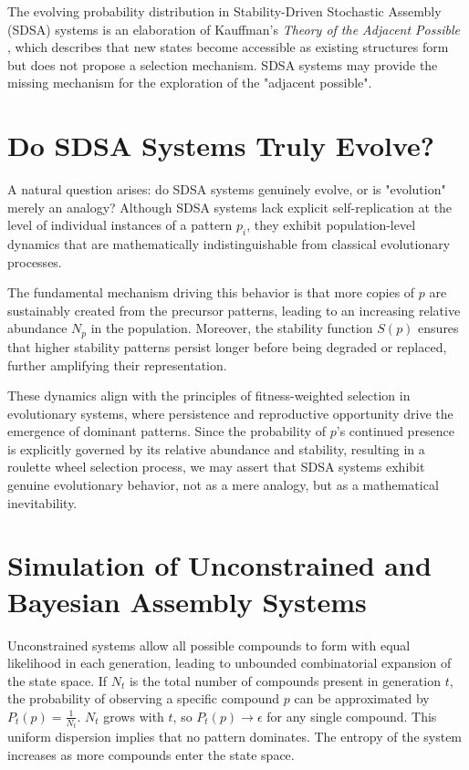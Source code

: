 \documentclass[preprint,12pt]{elsarticle}
\begin{document}
The evolving probability distribution in Stability-Driven Stochastic Assembly (SDSA) systems is an elaboration of Kauffman's \emph{Theory of the Adjacent Possible} \cite{kauffman2000investigations, kauffman2024tap}, which describes that new states become accessible as existing structures form but does not propose a selection mechanism. SDSA systems may provide the missing mechanism for the exploration of the "adjacent possible".

\section{Do SDSA Systems Truly Evolve?}

A natural question arises: do SDSA systems genuinely evolve, or is "evolution" merely an analogy? Although SDSA systems lack explicit self-replication at the level of individual instances of a pattern $p_i$, they exhibit population-level dynamics that are mathematically indistinguishable from classical evolutionary processes. 

The fundamental mechanism driving this behavior is that more copies of $p$ are sustainably created from the precursor patterns, leading to an increasing relative abundance $N_p$ in the population. Moreover, the stability function $S(p)$ ensures that higher stability patterns persist longer before being degraded or replaced, further amplifying their representation. 

These dynamics align with the principles of fitness-weighted selection in evolutionary systems, where persistence and reproductive opportunity drive the emergence of dominant patterns. Since the probability of $p$'s continued presence is explicitly governed by its relative abundance and stability, resulting in a roulette wheel selection process, we may assert that SDSA systems exhibit genuine evolutionary behavior, not as a mere analogy, but as a mathematical inevitability.


\section{Simulation of Unconstrained and Bayesian Assembly Systems}

Unconstrained systems allow all possible compounds to form with equal likelihood in each generation, leading to unbounded combinatorial expansion of the state space. If $N_t$ is the total number of compounds present in generation $t$, the probability of observing a specific compound $p$ can be approximated by $P_t(p) = \frac{1}{N_t}$. $N_t$ grows with $t$, so $P_t(p) \to \epsilon$ for any single compound. This uniform dispersion implies that no pattern dominates. The entropy of the system increases as more compounds enter the state space.
\end{document}
